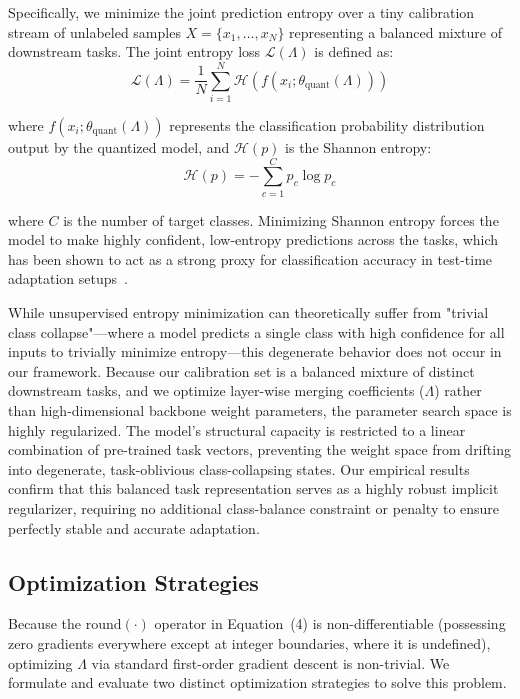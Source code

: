 Specifically, we minimize the joint prediction entropy over a tiny calibration stream of unlabeled samples $X = \{x_1, \dots, x_N\}$ representing a balanced mixture of downstream tasks. The joint entropy loss $\mathcal{L}(\Lambda)$ is defined as:
\label{eq:entropy_loss}
\begin{equation}
    \mathcal{L}(\Lambda) = \frac{1}{N} \sum_{i=1}^N \mathcal{H}\left(f\left(x_i; \theta_{\text{quant}}(\Lambda)\right)\right)
\end{equation}

where $f(x_i; \theta_{\text{quant}}(\Lambda))$ represents the classification probability distribution output by the quantized model, and $\mathcal{H}(p)$ is the Shannon entropy:
\begin{equation}
    \mathcal{H}(p) = -\sum_{c=1}^C p_c \log p_c
\end{equation}

where $C$ is the number of target classes. Minimizing Shannon entropy forces the model to make highly confident, low-entropy predictions across the tasks, which has been shown to act as a strong proxy for classification accuracy in test-time adaptation setups~\cite{yang2024adamerging}.

While unsupervised entropy minimization can theoretically suffer from "trivial class collapse"---where a model predicts a single class with high confidence for all inputs to trivially minimize entropy---this degenerate behavior does not occur in our framework. Because our calibration set is a balanced mixture of distinct downstream tasks, and we optimize layer-wise merging coefficients ($\Lambda$) rather than high-dimensional backbone weight parameters, the parameter search space is highly regularized. The model's structural capacity is restricted to a linear combination of pre-trained task vectors, preventing the weight space from drifting into degenerate, task-oblivious class-collapsing states. Our empirical results confirm that this balanced task representation serves as a highly robust implicit regularizer, requiring no additional class-balance constraint or penalty to ensure perfectly stable and accurate adaptation.

\subsection{Optimization Strategies}
Because the $\text{round}(\cdot)$ operator in Equation~(4) is non-differentiable (possessing zero gradients everywhere except at integer boundaries, where it is undefined), optimizing $\Lambda$ via standard first-order gradient descent is non-trivial. We formulate and evaluate two distinct optimization strategies to solve this problem.

